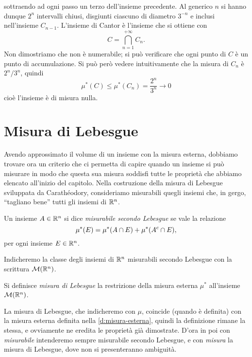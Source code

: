 sottraendo ad ogni passo un terzo dell'insieme precedente.
Al generico $n$ si hanno dunque $2^n$ intervalli chiusi, disgiunti ciascuno di diametro $3^{-n}$ e inclusi nell'insieme $C_{n-1}$.
L'insieme di Cantor è l'insieme che si ottiene con
\begin{equation}
	C=\bigcap_{n=1}^{+\infty}C_n.
\end{equation}
Non dimostriamo che non è numerabile; si può verificare che ogni punto di $C$ è un punto di accumulazione.
Si può però vedere intuitivamente che la misura di $C_n$ è $2^n/3^n$, quindi
\begin{equation}
	\mu^*(C)\leq\mu^*(C_n)=\frac{2^n}{3^n}\to 0
\end{equation}
cioè l'insieme è di misura nulla.

\section{Misura di Lebesgue}
\label{sec:misura-lebesgue}
Avendo approssimato il volume di un insieme con la misura esterna, dobbiamo trovare ora un criterio che ci permetta di capire quando un insieme si può misurare in modo che questa sua misura soddisfi tutte le proprietà che abbiamo elencato all'inizio del capitolo.
Nella costruzione della misura di Lebesgue sviluppata da Carath\'eodory, consideriamo misurabili quegli insiemi che, in gergo, ``tagliano bene'' tutti gli insiemi di $\mathbb{R}^n$.
\begin{definizione} \label{d:lebesgue-misurabile}
	Un insieme $A\in\mathbb{R}^n$ si dice \emph{misurabile secondo Lebesgue} se vale la relazione
	\begin{equation}
		\mu^*(E)=\mu^*(A\cap E)+\mu^*({A}^c\cap E),
		\label{eq:lebesgue-misurabile}
	\end{equation}
	per ogni insieme $E\in\mathbb{R}^n$.
\end{definizione}
Indicheremo la classe degli insiemi di $\mathbb{R}^n$ misurabili secondo Lebesgue con la scrittura $\mathcal M(\mathbb{R}^n)$.
\begin{definizione} \label{d:misura-lebesgue}
	Si definisce \emph{misura di Lebesgue} la restrizione della misura esterna $\mu^*$ all'insieme $\mathcal M(\mathbb{R}^n)$.
\end{definizione}
La misura di Lebesgue, che indicheremo con $\mu$, coincide (quando è definita) con la misura esterna definita nella \ref{d:misura-esterna}, quindi la definizione rimane la stessa, e ovviamente ne eredita le proprietà già dimostrate.
D'ora in poi con \emph{misurabile} intenderemo sempre misurabile secondo Lebesgue, e con \emph{misura} la misura di Lebesgue, dove non si presenteranno ambiguità.
